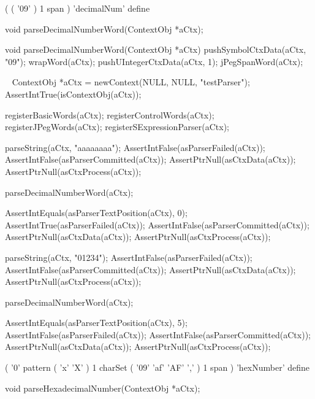 \startTestSuite[parseDecimalNumberWord]

\starttyping
(
  ( '09' ) 1 span
) 'decimalNum' define
\stoptyping

\startCHeader
void parseDecimalNumberWord(ContextObj *aCtx);
\stopCHeader

\startCCode
void parseDecimalNumberWord(ContextObj *aCtx) {
  pushSymbolCtxData(aCtx, "09");
  wrapWord(aCtx);
  pushUIntegerCtxData(aCtx, 1);
  jPegSpanWord(aCtx);  
}
\stopCCode

\CTestsSuiteSetup\
\startCTest
  ContextObj *aCtx = newContext(NULL, NULL, "testParser");
  AssertIntTrue(isContextObj(aCtx));
  
  registerBasicWords(aCtx);
  registerControlWords(aCtx);
  registerJPegWords(aCtx);
  registerSExpressionParser(aCtx);
\stopCTest

\startCTest
  parseString(aCtx, "aaaaaaaa");
  AssertIntFalse(asParserFailed(aCtx));
  AssertIntFalse(asParserCommitted(aCtx));
  AssertPtrNull(asCtxData(aCtx));
  AssertPtrNull(asCtxProcess(aCtx));
  
  parseDecimalNumberWord(aCtx);
  
  AssertIntEquals(asParserTextPosition(aCtx), 0);
  AssertIntTrue(asParserFailed(aCtx));
  AssertIntFalse(asParserCommitted(aCtx));
  AssertPtrNull(asCtxData(aCtx));
  AssertPtrNull(asCtxProcess(aCtx));
\stopCTest
\stopTestCase

\startCTest
  parseString(aCtx, "01234");
  AssertIntFalse(asParserFailed(aCtx));
  AssertIntFalse(asParserCommitted(aCtx));
  AssertPtrNull(asCtxData(aCtx));
  AssertPtrNull(asCtxProcess(aCtx));
  
  parseDecimalNumberWord(aCtx);
  
  AssertIntEquals(asParserTextPosition(aCtx), 5);
  AssertIntFalse(asParserFailed(aCtx));
  AssertIntFalse(asParserCommitted(aCtx));
  AssertPtrNull(asCtxData(aCtx));
  AssertPtrNull(asCtxProcess(aCtx));
\stopCTest
\stopTestCase
\stopTestSuite

\startTestSuite[parseHexNumberWord]

\starttyping
(
  '0' pattern
  ( 'x' 'X' ) 1 charSet
  ( '09' 'af' 'AF' ',' ) 1 span
) 'hexNumber' define
\stoptyping

\startCHeader
void parseHexadecimalNumber(ContextObj *aCtx);
\stopCHeader

